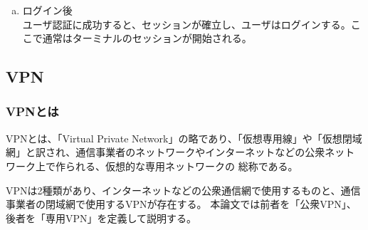 \documentclass[12pt,a4paper,titlepage]{jsarticle}
\begin{document}
\begin{enumerate}[(a)]
\begin{enumerate}[(1)]
    \end{enumerate}
    \item ログイン後\mbox{}\\
    ユーザ認証に成功すると、セッションが確立し、ユーザはログインする。ここで通常はターミナルのセッションが開始される。
    
\end{enumerate}






\subsection{VPN}

\subsubsection*{VPNとは}
VPNとは、「Virtual Private Network」の略であり、「仮想専用線」や「仮想閉域網」と訳され、通信事業者のネットワークやインターネットなどの公衆ネットワーク上で作られる、仮想的な専用ネットワークの
総称である。

VPNは2種類があり、インターネットなどの公衆通信網で使用するものと、通信事業者の閉域網で使用するVPNが存在する。
本論文では前者を「公衆VPN」、後者を「専用VPN」を定義して説明する。

    
\end{document}
